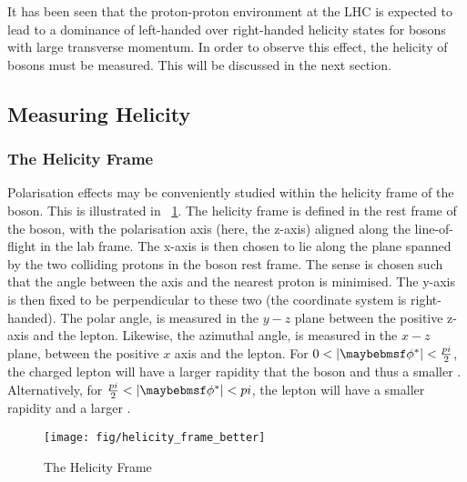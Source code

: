 It has been seen that the proton-proton environment at the \ac{LHC} is expected
to lead to a dominance of left-handed over right-handed helicity states for \PW
bosons with large transverse momentum. In order to observe this effect, the
helicity of \PW bosons must be measured. This will be discussed in the next section.

\subsection{Measuring Helicity}
\subsubsection{The Helicity Frame}
Polarisation effects may be conveniently studied within the helicity frame of
the \PW boson. This is illustrated in \fig~\ref{fig:wpol_helicity_frame}. The
helicity frame is defined in the rest frame of the \PW boson, with the
polarisation axis (here, the z-axis) aligned along the \PW line-of-flight in the
lab frame. The x-axis is then chosen to lie along the plane spanned by the two
colliding protons in the boson rest frame. The sense is chosen such that the
angle between the axis and the nearest proton is minimised. The y-axis is then
fixed to be perpendicular to these two (the coordinate system is
right-handed). The polar angle, \thetastar is measured in the $y-z$ plane
between the positive z-axis and the lepton. Likewise, the azimuthal angle,
\phistar is measured in the $x-z$ plane, between the positive $x$ axis and the
lepton. For $0 < |\phistar| < \frac{\pi}{2}$, the charged lepton will have a
larger rapidity that the \PW boson and thus a smaller \Pt. Alternatively, for
$\frac{\pi}{2} < |\phistar| < \pi$, the lepton will have a smaller rapidity and
a larger \Pt.

\begin{figure}[h!]
\texttt{[image: fig/helicity\_frame\_better]}
\caption[The Helicity Frame]{The Helicity Frame~\cite{berger_left_handed_w}}
\label{fig:wpol_helicity_frame}
\end{figure}

